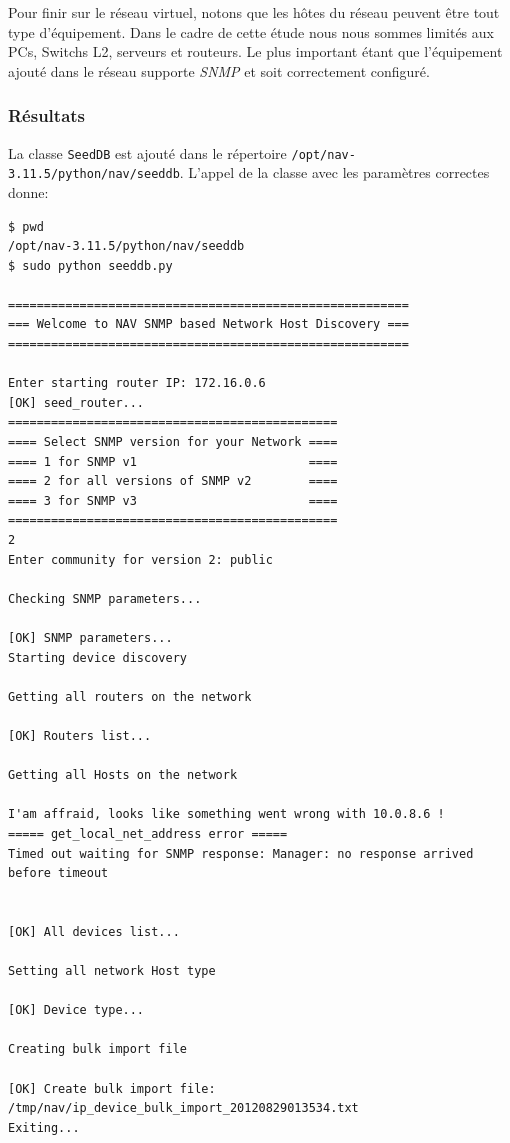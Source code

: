 Pour finir sur le réseau virtuel, notons que les hôtes du réseau peuvent être tout type d'équipement. Dans le cadre de cette étude nous nous sommes limités aux PCs, Switchs L2, serveurs et routeurs. Le plus important étant que l'équipement ajouté dans le réseau supporte \emph{SNMP} et soit correctement configuré.

\subsubsection{Résultats}
La classe \texttt{SeedDB} est ajouté dans le répertoire \texttt{/opt/nav-3.11.5/python/nav/seeddb}. L'appel de la classe avec les paramètres correctes donne:
\begin{lstlisting}[frame=single] 
$ pwd
/opt/nav-3.11.5/python/nav/seeddb
$ sudo python seeddb.py

========================================================
=== Welcome to NAV SNMP based Network Host Discovery ===
========================================================

Enter starting router IP: 172.16.0.6
[OK] seed_router...
==============================================
==== Select SNMP version for your Network ====
==== 1 for SNMP v1                        ====
==== 2 for all versions of SNMP v2        ====
==== 3 for SNMP v3                        ====
==============================================
2
Enter community for version 2: public

Checking SNMP parameters...

[OK] SNMP parameters...
Starting device discovery

Getting all routers on the network

[OK] Routers list...

Getting all Hosts on the network

I'am affraid, looks like something went wrong with 10.0.8.6 !
===== get_local_net_address error =====
Timed out waiting for SNMP response: Manager: no response arrived before timeout


[OK] All devices list...

Setting all network Host type

[OK] Device type...

Creating bulk import file

[OK] Create bulk import file: /tmp/nav/ip_device_bulk_import_20120829013534.txt
Exiting...


\end{lstlisting} 
